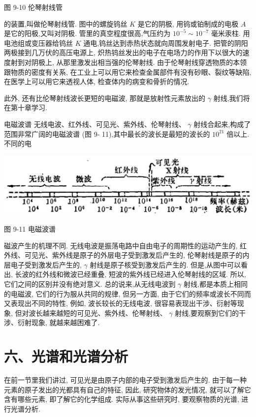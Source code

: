 \documentclass[10pt]{article}
\begin{document}
图 9-10 伦琴射线管

的装置,叫做伦琴射线管. 图中的螺旋钨丝 \(K\) 是它的阴极, 用钨或铂制成的电极 \(A\) 是它的阳极,又叫对阴极. 管里的真空程度很高,气压约为 \({10}^{-5} \sim {10}^{-7}\) 毫米汞柱. 用电池组或变压器给钨丝 \(K\) 通电,钨丝达到赤热状态就向周围发射电子. 把管的阴阳两极接到几万伏的高压电源上, 炽热钨丝发出的电子在电场力的作用下以很大的速度射到对阴极上, 从那里激发出相当强的伦琴射线. 由于伦琴射线穿透物质的本领跟物质的密度有关系, 在工业上可以用它来检查金属部件有没有砂眼、裂纹等缺陷, 在医学上可以用它来透视人体, 检查体内的病变和骨折的情况.

此外, 还有比伦琴射线波长更短的电磁波, 那就是放射性元素放出的 \(\gamma\) 射线,我们将在第十章学习.

电磁波谱 无线电波、红外线、可见光、紫外线、伦琴射线、 \(\gamma\) 射线合起来,构成了范围非常广阔的电磁波谱 (图 9- 11),其中最长的波长是最短的波长的 \({10}^{21}\) 倍以上. 不同的电

\begin{center}
\includegraphics[max width=1.0\textwidth]{images/01913056-1f15-74d8-9184-9aab52c9d66b_312_508675.jpg}
\end{center}

图 9-11 电磁波谱

磁波产生的机理不同. 无线电波是振荡电路中自由电子的周期性的运动产生的, 红外线、可见光、紫外线是原子的外层电子受到激发后产生的, 伦琴射线是原子的内层电子受到激发后产生的, \(\gamma\) 射线是原子核受到激发后产生的. 但是,从图中可以看出, 长波的红外线和微波已经重叠, 短波的紫外线已经进入伦琴射线的区域. 所以, 它们之间的区别并没有绝对意义. 总的说来,从无线电波到 \(\gamma\) 射线,都是本质上相同的电磁波, 它们的行为服从共同的规律, 但另一方面, 由于它们的频率或波长不同而又表现出不同的特性, 例如, 波长较长的无线电波, 很容易表现出干涉、衍射等现象, 但对波长越来越短的可见光、紫外线、伦琴射线、 \(\gamma\) 射线,要观察到它们的干涉、衍射现象, 就越来越困难了.

\section*{六、光谱和光谱分析}

在前一节里我们讲过, 可见光是由原子内部的电子受到激发后产生的. 由于每一种元素的原子发出的光都具有自己的特征, 因此, 研究物体的发光情况, 就可以了解它含有哪些元素, 即了解它的化学组成. 实际从事这些研究时, 要观察物质的光谱, 进行光谱分析.
\end{document}
